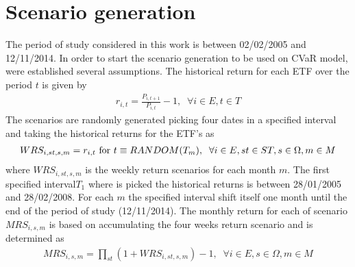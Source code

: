 \section{Scenario generation}
The period of study considered in this work is  between 02/02/2005 and 12/11/2014. In order to start the scenario generation to be used on CVaR model, were established several assumptions. The historical return for each ETF over the period $t$ is given by
\begin{gather}
r_{i,t} = \frac{P_{i,t+1}}{P_{i,t}}-1, \;\; \forall i \in E, t \in T
\end{gather}
The scenarios are randomly generated picking four dates in a specified interval and taking the historical returns for the ETF's as
\begin{gather}
WRS_{i,st,s,m} = r_{i,t}  \textup{ for } t \equiv RANDOM(T_{m}), \;\; \forall i \in E, st \in ST, s \in \Omega, m \in M
\end{gather}
where $WRS_{i,st,s,m}$ is the weekly return scenarios for each month $m$. The first specified interval$T_1$ where is picked the historical returns is between 28/01/2005 and 28/02/2008. For each $m$ the specified interval shift itself one month until the end of the period of study (12/11/2014). The monthly return for each of scenario $MRS_{i,s,m}$ is based on accumulating the four weeks return scenario and is determined as
\begin{gather}
MRS_{i,s,m} = \prod_{st} (1+WRS_{i,st,s,m}) -1, \;\; \forall i \in E, s \in \Omega, m \in M
\end{gather}
